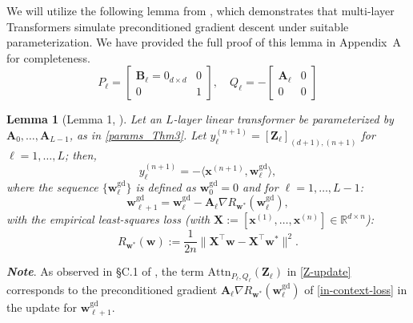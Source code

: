 \documentclass[11pt]{article}
\theoremstyle{plain}
\newtheorem{lemma}[theorem]{Lemma}
\theoremstyle{definition}
\theoremstyle{remark}
\numberwithin{equation}{section}
\begin{document}
We will utilize the following lemma from \cite{ahn2024transformers}, which demonstrates that multi-layer Transformers simulate preconditioned gradient descent under suitable parameterization. We have provided the full proof of this lemma in Appendix~A for completeness.
\begin{equation}
P_\ell = 
\begin{bmatrix}
\mathbf B_\ell = 0_{d \times d} & 0 \\
0 & 1
\end{bmatrix},
\quad
Q_\ell = 
-\begin{bmatrix}
\mathbf{A}_\ell & 0 \\
0 & 0
\end{bmatrix}%
\label{params_Thm3}
\end{equation}
\begin{lemma}[Lemma 1, \cite{ahn2024transformers}]
    Let an \(L\)-layer linear transformer be parameterized by \(\mathbf{A}_0, \dots, \mathbf{A}_{L-1}\), as in \eqref{params_Thm3}. Let %
    \(y_\ell^{(n+1)} = [\mathbf{Z}_\ell]_{(d+1),(n+1)}\) for \(\ell = 1, \dots, L\); then,
    \begin{equation}
    y_\ell^{(n+1)} = -\langle \mathbf{x}^{(n+1)}, \mathbf{w}_{\ell}^{\mathrm{gd}} \rangle,
    \end{equation}
    where the sequence \(\{\mathbf{w}_{\ell}^{\mathrm{gd}}\}\) is defined as \(\mathbf{w}_{0}^{\mathrm{gd}} = 0\) and for \(\ell = 1, \dots, L-1\):
    \begin{equation}
    \mathbf{w}_{\ell+1}^{\mathrm{gd}} = \mathbf{w}_{\ell}^{\mathrm{gd}} - \mathbf{A}_\ell \nabla R_{\mathbf{w}^*}(\mathbf{w}_{\ell}^{\mathrm{gd}}),
    \end{equation}
    with the empirical least-squares loss (with \(\mathbf{X} := [\mathbf x^{(1)}, \ldots, \mathbf x^{(n)}] \in \mathbb R^{d \times n}\)):
    \begin{equation}
    R_{\mathbf{w}^*}(\mathbf{w}) := \frac{1}{2n} \|\mathbf{X}^\top \mathbf{w} - \mathbf{X}^\top \mathbf{w}^*\|^2. %
    \label{in-context-loss}
    \end{equation}
\label{Lemma 1}
\end{lemma}
\vspace{-5mm}
\textit{\textbf{Note}}. As observed in \S{}C.1 of \cite{ahn2024transformers}, the term \(\mathrm{Attn}_{P_\ell, Q_\ell}(\mathbf{Z}_\ell)\) in \eqref{Z-update} corresponds to the preconditioned gradient \(\mathbf{A}_\ell \nabla R_{\mathbf{w}^*}(\mathbf{w}_\ell^\mathrm{gd})\) of \eqref{in-context-loss} in the update for \(\mathbf{w}_{\ell+1}^\mathrm{gd}\).
\end{document}
